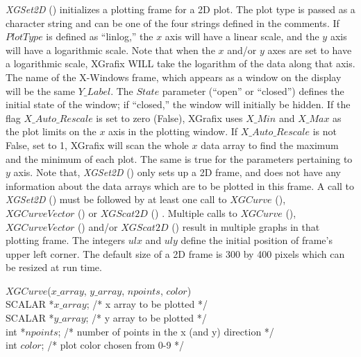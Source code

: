 {\em XGSet2D} () initializes a plotting frame for a 2D plot.  The plot type is passed 
as a character string and can be one of the four strings defined in the comments.  If
$PlotType$ is defined as ``linlog,'' the $x$ axis will have a linear scale, and the $y$
axis will have a logarithmic scale.  Note that when the $x$ and/or $y$ axes are set to have
a logarithmic scale, XGrafix WILL take the logarithm of the data along that axis.
The name of the X-Windows frame, which appears as a window on the display will be
the same $Y\_Label$.  The $State$ parameter (``open'' or ``closed'') defines the
initial state of the window; if ``closed,''
the window will initially be hidden.  If the flag $X\_Auto\_Rescale$ is
set to zero (False), XGrafix uses $X\_Min$ and $X\_Max$ as the plot limits on the $x$
axis in the plotting window.  If $X\_Auto\_Rescale$ is not False, set to 1, XGrafix will
scan the whole $x$ data array to find the maximum and the minimum of each plot.  The 
same is true for the parameters pertaining to $y$ axis.  Note that, {\em XGSet2D} ()
only sets up a 2D frame, and does not have any information about the data arrays which
are to be plotted in this frame.  A call to {\em XGSet2D} () must be followed by at
least one call to $XGCurve$ (), $XGCurveVector$ () or $XGScat2D$ () .  Multiple calls to $XGCurve$ (), $XGCurveVector$ ()  
and/or $XGScat2D$ () result in multiple graphs in that plotting frame. The integers
$ulx$ and $uly$ define the initial position of frame's upper left corner.  The default
size of a 2D frame is 300 by 400 pixels which can be resized at run time.

\begin{flushleft}
$XGCurve$($x\_array$, $y\_array$, $npoints$, $color$) \\
SCALAR   *$x\_array$;    /* x array to be plotted                         */ \\
SCALAR   *$y\_array$;    /* y array to be plotted                         */ \\
int     *$npoints$;    /* number of points in the x (and y) direction    */ \\
int      $color$;      /* plot color chosen from 0-9                   */
\end{flushleft}

